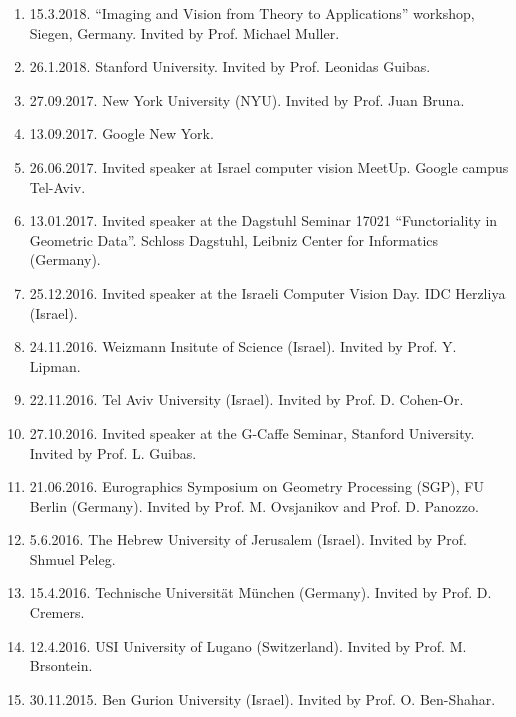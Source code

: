 \begin{enumerate}
	\item 15.3.2018. ``Imaging and Vision from Theory to Applications'' workshop, Siegen, Germany. Invited by Prof. Michael Muller.
	\item 26.1.2018. Stanford University. Invited by Prof. Leonidas Guibas.
	\item 27.09.2017. New York University (NYU). Invited by Prof. Juan Bruna. 
	\item 13.09.2017. Google New York.  
	\item 26.06.2017. Invited speaker at Israel computer vision MeetUp. Google campus Tel-Aviv.	
	\item 13.01.2017. Invited speaker at the Dagstuhl Seminar 17021 “Functoriality in Geometric Data”. Schloss Dagstuhl, Leibniz Center for Informatics (Germany).	
	\item 25.12.2016. Invited speaker at the Israeli Computer Vision Day. IDC Herzliya (Israel).
	\item 24.11.2016. Weizmann Insitute of Science (Israel). Invited by Prof. Y. Lipman.
	\item 22.11.2016. Tel Aviv University (Israel). Invited by Prof. D. Cohen-Or.	
	\item 27.10.2016. Invited speaker at the G-Caffe Seminar, Stanford University. Invited by Prof. L. Guibas. 
	\item 21.06.2016. Eurographics Symposium on Geometry Processing (SGP), FU Berlin (Germany). Invited by Prof. M. Ovsjanikov and Prof. D. Panozzo.	
	\item 5.6.2016. The Hebrew University of Jerusalem (Israel). Invited by Prof. Shmuel Peleg.	
	\item 15.4.2016. Technische Universität München (Germany). Invited by Prof. D. Cremers.
	\item 12.4.2016. USI University of Lugano (Switzerland). Invited by Prof. M. Brsontein.		
	\item 30.11.2015. Ben Gurion University (Israel). Invited by Prof. O. Ben-Shahar.		
	
\end{enumerate}